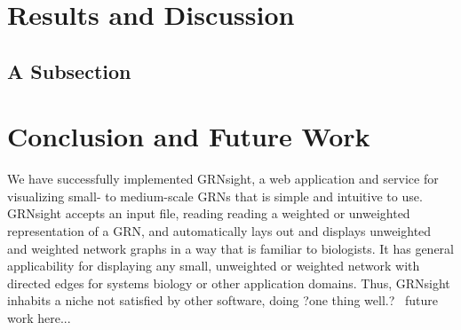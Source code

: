 \documentclass[sigconf,review,anonymous]{acmart}
\begin{document}
\section{Results and Discussion}

\subsection{A Subsection}

\section{Conclusion and Future Work}
We have successfully implemented GRNsight, a web application and service for visualizing small- to medium-scale GRNs that is simple and intuitive to use. GRNsight accepts an input file, reading reading a weighted or unweighted representation of a GRN, and automatically lays out and displays unweighted and weighted network graphs in a way that is familiar to biologists. It has general applicability for displaying any small, unweighted or weighted network with directed edges for systems biology or other application domains. Thus, GRNsight inhabits a niche not satisfied by other software, doing ?one thing well.? 
~future work here...~


 
\end{document}
